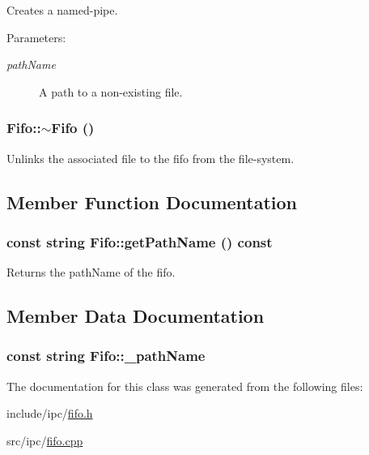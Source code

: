 Creates a named-pipe.

\begin{Desc}
\item[Parameters:]
\begin{description}
\item[{\em pathName}]A path to a non-existing file. \end{description}
\end{Desc}
\hypertarget{classFifo_c057810a530bf36506bd87ecd0a52964}{
\subsubsection[{$\sim$Fifo}]{\setlength{\rightskip}{0pt plus 5cm}Fifo::$\sim$Fifo ()}}
\label{classFifo_c057810a530bf36506bd87ecd0a52964}


Unlinks the associated file to the fifo from the file-system. 

\subsection{Member Function Documentation}
\hypertarget{classFifo_0010d358c0850b358405c31c9fdc1a62}{
\subsubsection[{getPathName}]{\setlength{\rightskip}{0pt plus 5cm}const string Fifo::getPathName () const}}
\label{classFifo_0010d358c0850b358405c31c9fdc1a62}


Returns the pathName of the fifo. 

\subsection{Member Data Documentation}
\hypertarget{classFifo_add312b626fe9b955ef6ad892740d1a5}{
\subsubsection[{\_\-pathName}]{\setlength{\rightskip}{0pt plus 5cm}const string {\bf Fifo::\_\-pathName}}}
\label{classFifo_add312b626fe9b955ef6ad892740d1a5}




The documentation for this class was generated from the following files:\begin{CompactItemize}
\item 
include/ipc/\hyperlink{fifo_8h}{fifo.h}\item 
src/ipc/\hyperlink{fifo_8cpp}{fifo.cpp}\end{CompactItemize}
